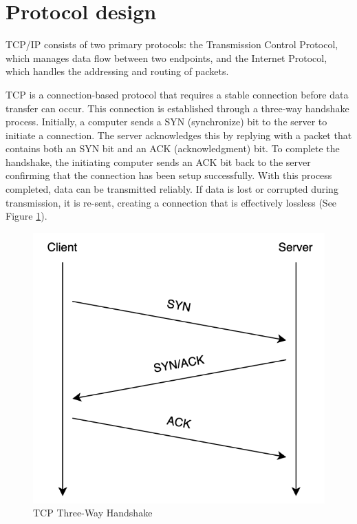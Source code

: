 \section{Protocol design}

TCP/IP consists of two primary protocols: the Transmission Control Protocol, which manages data flow between two endpoints, and the Internet Protocol, which handles the addressing and routing of packets.

TCP is a connection-based protocol that requires a stable connection before data transfer can occur. This connection is established through a three-way handshake process. Initially, a computer sends a SYN (synchronize) bit to the server to initiate a connection. The server acknowledges this by replying with a packet that contains both an SYN bit and an ACK (acknowledgment) bit. To complete the handshake, the initiating computer sends an ACK bit back to the server confirming that the connection has been setup successfully. With this process completed, data can be transmitted reliably. If data is lost or corrupted during transmission, it is re-sent, creating a connection that is effectively lossless (See Figure \ref{fig:tcp}).
\begin{figure}
    \centering
    \includegraphics[width=1\linewidth]{attachments/tcp_ip_protocol.drawio.png}
    \caption{TCP Three-Way Handshake}
    \label{fig:tcp}
\end{figure}